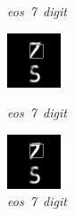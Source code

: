 \documentclass{article} %
\begin{document}
\begin{figure}[t]
  \caption{\mbox{\textit{eos 7 digit}}}
\endminipage\hfill
{}
  \includegraphics[width=\linewidth]{figures/5-7-26.png}
  \caption{\mbox{\textit{eos 7 digit}}}
\endminipage\hfill
{}
  \includegraphics[width=\linewidth]{figures/5-7-27.png}
  \caption{\mbox{\textit{eos 7 digit}}}
\endminipage\hfill


\end{figure}
\end{document}
